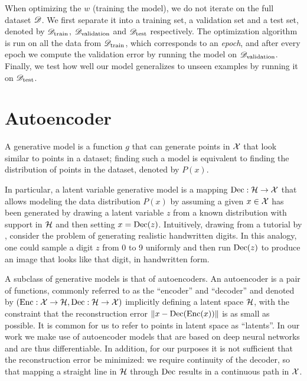 \documentclass[../main.tex]{subfiles}
\begin{document}
When optimizing the $w$ (training the model), we do not iterate on the full dataset $\mathscr{D}$.
We first separate it into a training set, a validation set and a test set, denoted by $\mathscr{D}_\text{train}$, $\mathscr{D}_\text{validation}$ and $\mathscr{D}_\text{test}$ respectively.
The optimization algorithm is run on all the data from $\mathscr{D}_\text{train}$, which corresponds to an \emph{epoch}, and after every epoch we compute the validation error by running the model on $\mathscr{D}_\text{validation}$.
Finally, we test how well our model generalizes to unseen examples by running it on $\mathscr{D}_\text{test}$.

\section{Autoencoder}

A generative model is a function $g$ that can generate points in $\mathcal{X}$ that look similar to points in a dataset; finding such a model is equivalent to finding the distribution of points in the dataset, denoted by $P(x)$.

In particular, a latent variable generative model is a mapping $\operatorname{Dec}: \mathcal{H} \to \mathcal{X}$ that allows modeling the data distribution $P(x)$ by assuming a given $x \in \mathcal{X}$ has been generated by drawing a latent variable $z$ from a known distribution with support in $\mathcal{H}$ and then setting $x = \operatorname{Dec}(z)$.
Intuitively, drawing from a tutorial by \citeauthor{doerschTutorial2021} \cite{doerschTutorial2021}, consider the problem of generating realistic handwritten digits.
In this analogy, one could sample a digit $z$ from 0 to 9 uniformly and then run $\operatorname{Dec}(z)$ to produce an image that looks like that digit, in handwritten form.

A subclass of generative models is that of autoencoders.
An autoencoder is a pair of functions, commonly referred to as the ``encoder'' and ``decoder'' and denoted by $(\operatorname{Enc}: \mathcal{X} \to \mathcal{H}, \operatorname{Dec}: \mathcal{H} \to \mathcal{X})$ implicitly defining a latent space $\mathcal{H}$, with the constraint that the reconstruction error $\left\lVert x - \operatorname{Dec}(\operatorname{Enc}(x))\right\rVert$ is as small as possible.
It is common for us to refer to points in latent space as ``latents''.
In our work we make use of autoencoder models that are based on deep neural networks and are thus differentiable.
In addition, for our purposes it is not sufficient that the reconstruction error be minimized: we require continuity of the decoder, so that mapping a straight line in $\mathcal{H}$ through $\operatorname{Dec}$ results in a continuous path in $\mathcal{X}$.
\end{document}
